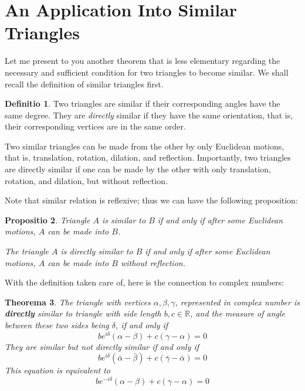 \documentclass[12pt, a4paper]{article}
\newtheorem{theorem}{Theorema}[section]
\newtheorem{proposition}[theorem]{Propositio}
\theoremstyle{definition}
\newtheorem{definition}[theorem]{Definitio}
\theoremstyle{remark}
\newcommand{\bb}[1]{\mathbb{#1}}
\begin{document}
\section{An Application Into Similar Triangles}

Let me present to you another theorem that is less elementary regarding the necessary and sufficient condition for two triangles to become similar. We shall recall the definition of similar triangles first.

\begin{definition}
Two triangles are similar if their corresponding angles have the same degree. 
They are \emph{directly} similar if they have the same orientation, that is, their corresponding vertices are in the same order.
\end{definition}

Two similar triangles can be made from the other by only Euclidean motions, that is, translation, rotation, dilation, and reflection. 
Importantly, two triangles are directly similar if one can be made by the other with only translation, rotation, and dilation, but without reflection. 

Note that similar relation is reflexive; thus we can have the following proposition: 

\begin{proposition}\label{prop:similarAndEuclideanMotion}
Triangle $A$ is similar to $B$ if and only if after some Euclidean motions, $A$ can be made into $B$. 

The triangle $A$ is directly similar to $B$ if and only if after some Euclidean motions, $A$ can be made into $B$ without reflection.
\end{proposition}

With the definition taken care of, here is the connection to complex numbers:
\begin{theorem}
	The triangle with vertices $\alpha, \beta, \gamma$, represented in complex number 
	is \textbf{directly} similar to triangle with side length $b, c \in \bb{R}$, and the measure of angle between these two sides being $\delta$, if and only if 
	\begin{equation}\label{eq:directSimilar}
		be^{i \delta}(\alpha - \beta) + c(\gamma - \alpha) = 0
	\end{equation}
	They are similar but not directly similar if and only if
	\begin{equation}
		be^{i \delta}(\bar{\alpha} - \bar{\beta}) + c(\bar{\gamma} - \bar{\alpha}) = 0
	\end{equation}
	This equation is equivalent to 
	\begin{equation}\label{eq:nondirectsimilar}
		be^{-i \delta}(\alpha - \beta) + c(\gamma - \alpha) = 0
	\end{equation}
\end{theorem}
\end{document}
